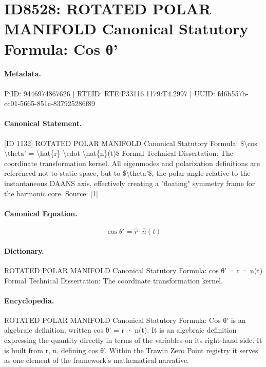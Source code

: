 \section*{ID8528: ROTATED POLAR MANIFOLD Canonical Statutory Formula: Cos θ'}
\paragraph{Metadata.}
PiID: 9446974867626 | RTEID: RTE:P33116.1179:T4.2997 | UUID: fd6b557b-cc01-5665-851c-837925286f89

\paragraph{Canonical Statement.}
[ID 1132] ROTATED POLAR MANIFOLD Canonical Statutory Formula: \$\textbackslash{}cos \textbackslash{}theta' = \textbackslash{}hat\{r\} \textbackslash{}cdot \textbackslash{}hat\{n\}(t)\$ Formal Technical Dissertation: The coordinate transformation kernel. All eigenmodes and polarization definitions are referenced not to static space, but to \$\textbackslash{}theta'\$, the polar angle relative to the instantaneous DAANS axis, effectively creating a "floating" symmetry frame for the harmonic core. Source: [1]

\paragraph{Canonical Equation.}
\[
\cos \theta' = \hat{r} \cdot \hat{n}(t)
\]

\paragraph{Dictionary.}
ROTATED POLAR MANIFOLD Canonical Statutory Formula: cos θ' = r · n(t) Formal Technical Dissertation: The coordinate transformation kernel.

\paragraph{Encyclopedia.}
ROTATED POLAR MANIFOLD Canonical Statutory Formula: Cos θ' is an algebraic definition, written cos θ' = r · n(t). It is an algebraic definition expressing the quantity directly in terms of the variables on its right-hand side. It is built from r, n, defining cos θ'. Within the Trawin Zero Point registry it serves as one element of the framework's mathematical narrative.
